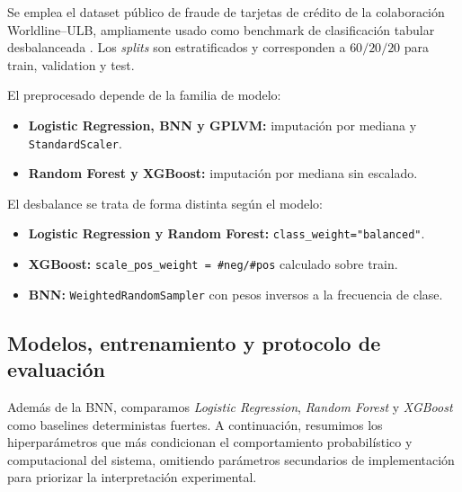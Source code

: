\documentclass{article}
\begin{document}
Se emplea el dataset público de fraude de tarjetas de crédito de la colaboración Worldline--ULB, ampliamente usado como benchmark de clasificación tabular desbalanceada \citep{dalpozzolo2015,kagglecreditcard}. Los \emph{splits} son estratificados y corresponden a $60/20/20$ para train, validation y test.

El preprocesado depende de la familia de modelo:
\begin{itemize}
    \item \textbf{Logistic Regression, BNN y GPLVM:} imputación por mediana y \texttt{StandardScaler}.
    \item \textbf{Random Forest y XGBoost:} imputación por mediana sin escalado.
\end{itemize}

El desbalance se trata de forma distinta según el modelo:
\begin{itemize}
    \item \textbf{Logistic Regression y Random Forest:} \texttt{class\_weight="balanced"}.
    \item \textbf{XGBoost:} \texttt{scale\_pos\_weight = \#neg/\#pos} calculado sobre train.
    \item \textbf{BNN:} \texttt{WeightedRandomSampler} con pesos inversos a la frecuencia de clase.
\end{itemize}

\subsection{Modelos, entrenamiento y protocolo de evaluación}

Además de la BNN, comparamos \emph{Logistic Regression}, \emph{Random Forest} y \emph{XGBoost} como baselines deterministas fuertes. A continuación, resumimos los hiperparámetros que más condicionan el comportamiento probabilístico y computacional del sistema, omitiendo parámetros secundarios de implementación para priorizar la interpretación experimental.
\end{document}
